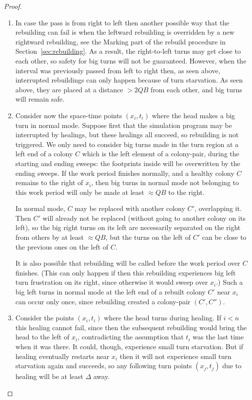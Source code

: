 \documentclass[11pt]{memoir}
\theoremstyle{definition} %
\def\B{B}
\newcommand{\Q}{Q} %
\begin{document}
\begin{proof}
\begin{enumerate}
    \item \label{i:safe-for-turns.right-to-left}
    In case the pass is from right to left then another possible way that the rebuilding can fail
    is when the leftward rebuilding is overridden by a new rightward rebuilding, see the Marking part of the
    rebuild procedure in Section~\ref{sec:rebuilding}.
    As a result, the right-to-left turns may get close to each other,
    so safety for big turns will not be guaranteed.
    However, when the interval was previously passed from left to right then, as seen above,
    interrupted rebuildings can only happen because of turn starvation.
    As seen above,
    they are placed at a distance \( >2\Q\B \) from each other, and big turns will remain safe.
 
  \item Consider now the space-time points \( (x_{i},t_{i}) \)
    where the head makes a big turn in normal mode.
    Suppose first that the simulation program may be interrupted by healings, but these
    healings all succeed, so rebuilding is not triggered.
    We only need to consider big turns made in the turn region at a left end of a colony \( C \)
    which is the left element of a colony-pair, during the starting and ending sweeps:
    the footprints inside will be overwritten by the ending sweeps.
    If the work period finishes normally, and a healthy colony \( C \)
    remains to the right of \( x_{i} \), then 
    big turns in normal mode not belonging to this work period
    will only be made at least \( \approx \Q\B \) to the right.

    In normal mode, \( C \) may be replaced with another colony \( C' \), overlapping it.
    Then \( C' \) will already not be replaced (without going to another colony on its left),
    so the big right turns on its left are necessarily separated on the
    right from others by at least \( \approx\Q\B \), but the turns on the left of \( C' \)
    can be close to the previous ones on the left of \( C \).
    
    It is also possible that rebuilding will be called before the work period over \( C \) finishes.
    (This can only happen if then this rebuilding experiences big left turn frustration on its right,
    since otherwise it would sweep over \( x_{i} \).)
    Such a big left turns in normal mode at the left end of a rebuilt
    colony \( C' \) near \( x_{i} \) can occur only once, since rebuilding
    created a colony-pair \( (C',C'') \).
    
    \item Consider the points \( (x_{i},t_{i}) \) where the head turns during healing.
  If \( i<n \) this healing cannot fail, since then the subsequent rebuilding would bring the head to the left
  of \( x_{i} \), contradicting the assumption that \( t_{i} \) was the last time when it was there.
  It could, though, experience small turn starvation.
  But if healing eventually restarts near \( x_{i} \) then it will not experience small turn
  starvation again and succeeds, so any following turn points \( (x_{j},t_{j}) \) due to healing will be
  at least \( \Delta \) away.


\end{enumerate}
\end{proof}
\end{document}
